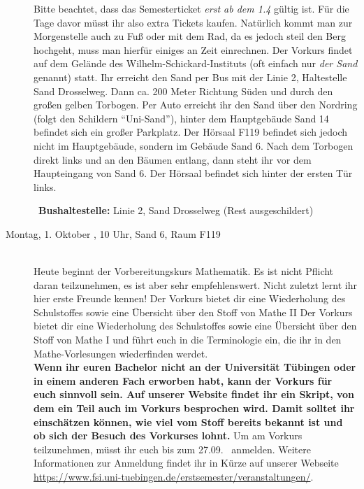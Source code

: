 \begin{description}
\ifsommersemester
Bitte beachtet, dass das Semesterticket \emph{erst ab dem 1.4} gültig ist. Für die Tage davor müsst ihr also extra Tickets kaufen. Natürlich kommt man zur Morgenstelle auch zu Fuß oder mit dem Rad, da es jedoch steil den Berg hochgeht, muss man hierfür einiges an Zeit einrechnen.
\fi
Der Vorkurs findet auf dem Gelände des Wilhelm-Schickard-Instituts (oft einfach nur \emph{der Sand} genannt) statt. Ihr erreicht den Sand per Bus mit der Linie 2, Haltestelle Sand Drosselweg. Dann ca. 200 Meter Richtung Süden und durch den großen gelben Torbogen. Per Auto erreicht ihr den Sand über den Nordring (folgt den Schildern "`Uni-Sand"'), hinter dem Hauptgebäude Sand 14 befindet sich ein großer Parkplatz. Der Hörsaal F119 befindet sich jedoch nicht im Hauptgebäude, sondern im Gebäude Sand 6. Nach dem Torbogen direkt links und an den Bäumen entlang, dann steht ihr vor dem Haupteingang von Sand 6. Der Hörsaal befindet sich hinter der ersten Tür links.

~\textbf{Bushaltestelle:} Linie 2, Sand Drosselweg (Rest ausgeschildert)
\fi


\else
\item[Montag, 1. Oktober \Jahr, 10 Uhr, Sand 6, Raum F119]\ \\
Heute beginnt der Vorbereitungskurs Mathematik. Es ist nicht Pflicht daran teilzunehmen,
es ist aber sehr empfehlenswert. Nicht zuletzt lernt ihr hier erste Freunde kennen!
\ifsommersemester
Der Vorkurs bietet dir eine Wiederholung des Schulstoffes sowie eine Übersicht über den Stoff von Mathe II
\fi
\ifwintersemester
Der Vorkurs bietet dir eine Wiederholung des Schulstoffes sowie eine Übersicht über den Stoff von Mathe I
\fi
und führt euch in die Terminologie ein, die ihr in den Mathe-Vorlesungen wiederfinden werdet.
\ifmaster
\\
\textbf{Wenn ihr euren Bachelor nicht an der Universität Tübingen oder in einem anderen Fach erworben habt, kann der Vorkurs für euch sinnvoll sein. Auf unserer Website findet ihr ein Skript, von dem ein Teil auch im Vorkurs besprochen wird. Damit solltet ihr einschätzen können, wie viel vom Stoff bereits bekannt ist und ob sich der Besuch des Vorkurses lohnt.}
\fi
Um am Vorkurs teilzunehmen, müsst ihr euch bis zum 27.09. \Jahr~anmelden. Weitere Informationen zur Anmeldung findet ihr in Kürze auf unserer Webseite \url{https://www.fsi.uni-tuebingen.de/erstsemester/veranstaltungen/}.


\end{description}
